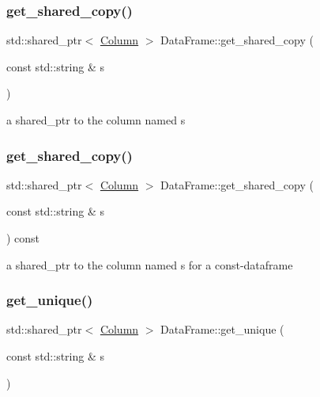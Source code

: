 \subsubsection{\texorpdfstring{get\+\_\+shared\+\_\+copy()}{get\_shared\_copy()}\hspace{0.1cm}{\footnotesize\ttfamily [1/2]}}
{\footnotesize\ttfamily std\+::shared\+\_\+ptr$<$ \hyperlink{classColumn}{Column} $>$ Data\+Frame\+::get\+\_\+shared\+\_\+copy (\begin{DoxyParamCaption}\item[{const std\+::string \&}]{s }\end{DoxyParamCaption})\hspace{0.3cm}{\ttfamily [private]}}

a shared\+\_\+ptr to the column named s \mbox{\label{classDataFrame_a97842254d757876650ea5bada057855e}} 
\subsubsection{\texorpdfstring{get\+\_\+shared\+\_\+copy()}{get\_shared\_copy()}\hspace{0.1cm}{\footnotesize\ttfamily [2/2]}}
{\footnotesize\ttfamily std\+::shared\+\_\+ptr$<$ \hyperlink{classColumn}{Column} $>$ Data\+Frame\+::get\+\_\+shared\+\_\+copy (\begin{DoxyParamCaption}\item[{const std\+::string \&}]{s }\end{DoxyParamCaption}) const\hspace{0.3cm}{\ttfamily [private]}}

a shared\+\_\+ptr to the column named s for a const-\/dataframe \mbox{\label{classDataFrame_a5909652f24e66c22922b4b4c910f2b09}} 
\subsubsection{\texorpdfstring{get\+\_\+unique()}{get\_unique()}}
{\footnotesize\ttfamily std\+::shared\+\_\+ptr$<$ \hyperlink{classColumn}{Column} $>$ Data\+Frame\+::get\+\_\+unique (\begin{DoxyParamCaption}\item[{const std\+::string \&}]{s }\end{DoxyParamCaption})}



